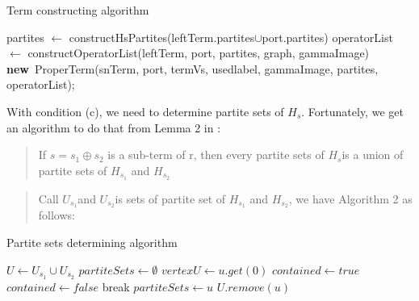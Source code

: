 \documentclass[a4paper, 12pt]{article}
\begin{document}
\begin{algorithm}
\caption{Term constructing algorithm}
\begin{algorithmic}[1]
	\Else
	\EndIf
	\State partites {$\gets$} constructHsPartites(leftTerm.partites{$\cup$}port.partites)
	\State operatorList {$\gets$} constructOperatorList(leftTerm, port,
                partites, graph, gammaImage)\linebreak
	\State \Return \textbf{new}\ ProperTerm(snTerm, port, termVs, usedlabel,
                gammaImage, partites, operatorList);
\EndFunction
\end{algorithmic}

\end{algorithm}
With condition (c), we need to determine partite sets of \textit {$H_{s}$}. Fortunately, we get an algorithm to do that from Lemma 2 in \cite {vadim-lozin} : 

\begin{quotation}
If $s=s_{1}\oplus s_{2}$ is a sub-term of r, then every partite sets of \textit {$H_{s}$}is a union of partite sets of $H_{s_{1}}$ and $H_{s_{2}}$ 
\end{quotation}

\begin{quotation}
Call $U_{s_{1}}$and $U_{s_{2}}$is sets of partite set of $H_{s_{1}}$ and $H_{s_{2}}$, we have Algorithm 2 as follows:
\end{quotation}

\begin{algorithm}[H]
\caption{Partite sets determining algorithm}
\begin{algorithmic}[1]
	\State $U\gets U_{s_{1}} \cup U_{s_{2}}$ 
		\State $partiteSets\leftarrow\emptyset$
			\State $vertexU\gets u.get(0)$
				\State $contained\gets true$
					\State $contained\gets false$
					\State break
				\EndIf
			\EndFor
				\State $partiteSets\gets u$
				\State $U.remove(u)$
			\EndIf
		\EndFor
	\EndWhile 
\end{algorithmic}
\end{algorithm}
\end{document}

